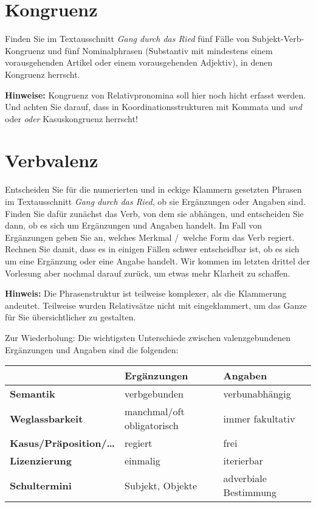 \section{Kongruenz}

Finden Sie im Textausschnitt \textit{Gang durch das Ried} fünf Fälle von Subjekt-Verb-Kongruenz und fünf Nominalphrasen (Substantiv mit mindestens einem vorausgehenden Artikel oder einem vorausgehenden Adjektiv), in denen Kongruenz herrscht.

\textbf{Hinweise:} Kongruenz von Relativpronomina soll hier noch hicht erfasst werden. Und achten Sie darauf, dass in Koordinationsstrukturen mit Kommata und \textit{und} oder \textit{oder} Kasuskongruenz herrscht!

\section{Verbvalenz}

Entscheiden Sie für die numerierten und in eckige Klammern gesetzten Phrasen im Textausschnitt \textit{Gang durch das Ried}, ob sie Ergänzungen oder Angaben sind.
Finden Sie dafür zunächst das Verb, von dem sie abhängen, und entscheiden Sie dann, ob es sich um Ergänzungen und Angaben handelt.
Im Fall von Ergänzungen geben Sie an, welches Merkmal \slash\ welche Form das Verb regiert.
Rechnen Sie damit, dass es in einigen Fällen schwer entscheidbar ist, ob es sich um eine Ergänzung oder eine Angabe handelt.
Wir kommen im letzten drittel der Vorlesung aber nochmal darauf zurück, um etwas mehr Klarheit zu schaffen.

\textbf{Hinweis:} Die Phrasenstruktur ist teilweise komplexer, als die Klammerung andeutet.
Teilweise wurden Relativsätze nicht mit eingeklammert, um das Ganze für Sie übersichtlicher zu gestalten.

Zur Wiederholung: Die wichtigsten Unterschiede zwischen valenzgebundenen Ergänzungen und Angaben sind die folgenden:

\Zeile

\begin{center}
  \begin{tabular}[h]{lll}
    \toprule
    & \textbf{Ergänzungen} & \textbf{Angaben} \\
    \midrule
    \textbf{Semantik} & verbgebunden & verbunabhängig \\
    \textbf{Weglassbarkeit} & manchmal\slash oft obligatorisch & immer fakultativ \\
    \textbf{Kasus\slash Präposition\slash\ldots} & regiert & frei \\
    \textbf{Lizenzierung} & einmalig & iterierbar \\
    \midrule
    \textbf{Schultermini} & Subjekt, Objekte & adverbiale Bestimmung \\
    \bottomrule
  \end{tabular}
\end{center}

